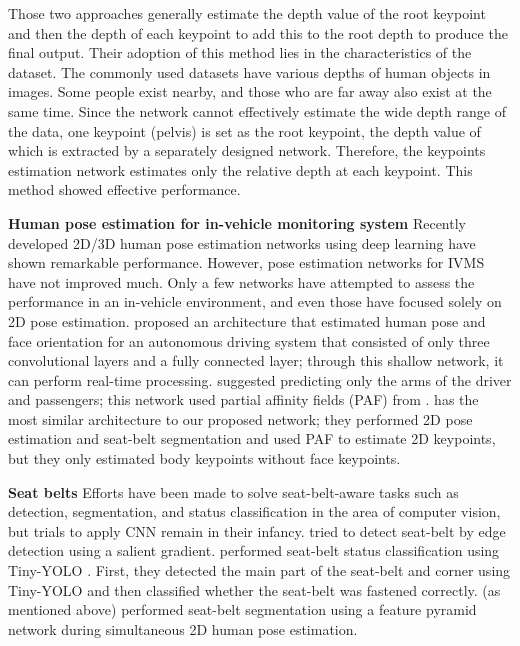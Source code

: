 \documentclass[letterpaper]{article} %
\begin{document}
Those two approaches generally estimate the depth value of the root keypoint and then the depth of each keypoint to add this to the root depth to produce the final output. Their adoption of this method lies in the characteristics of the dataset. The commonly used datasets \cite{ionescu2013human3, mehta2018single} have various depths of human objects in images. Some people exist nearby, and those who are far away also exist at the same time. Since the network cannot effectively estimate the wide depth range of the data, one keypoint (pelvis) is set as the root keypoint, the depth value of which is extracted by a separately designed network. Therefore, the keypoints estimation network estimates only the relative depth at each keypoint. This method showed effective performance.

\textbf{Human pose estimation for in-vehicle monitoring system} Recently developed 2D/3D human pose estimation networks using deep learning have shown remarkable performance. However, pose estimation networks for IVMS have not improved much. Only a few networks \cite{okuno2018body, yuen2018looking, chun2019nads, heo2020lightweight} have attempted to assess the performance in an in-vehicle environment, and even those have focused solely on 2D pose estimation. \cite{okuno2018body} proposed an architecture that estimated human pose and face orientation for an autonomous driving system that consisted of only three convolutional layers and a fully connected layer; through this shallow network, it can perform real-time processing. \cite{yuen2018looking} suggested predicting only the arms of the driver and passengers; this network used partial affinity fields (PAF) from \cite{cao2017realtime}. \cite{chun2019nads} has the most similar architecture to our proposed network; they performed 2D pose estimation and seat-belt segmentation and used PAF to estimate 2D keypoints, but they only estimated body keypoints without face keypoints.

\textbf{Seat belts} Efforts have been made to solve seat-belt-aware tasks such as detection, segmentation, and status classification in the area of computer vision, but trials to apply CNN remain in their infancy. \cite{zhou2017learning} tried to detect seat-belt by edge detection using a salient gradient. \cite{kashevnik2020seat} performed seat-belt status classification using Tiny-YOLO \cite{redmon2016you}. First, they detected the main part of the seat-belt and corner using Tiny-YOLO and then classified whether the seat-belt was fastened correctly. \cite{chun2019nads} (as mentioned above) performed seat-belt segmentation using a feature pyramid network during simultaneous 2D human pose estimation.
\end{document}
